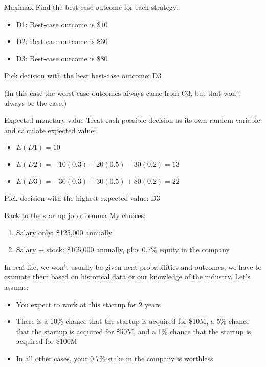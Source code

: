 \documentclass{beamer}\usepackage[]{graphicx}\usepackage[]{color}
\begin{document}
\begin{darkframes}
\begin{frame}{Maximax}
    Find the best-case outcome for each strategy:
    \begin{itemize}
      \item D1: Best-case outcome is $\$10$
      \item D2: Best-case outcome is $\$30$
      \item D3: Best-case outcome is $\$80$
    \end{itemize}
    Pick decision with the best best-case outcome: D3

    \pause
    
    (In this case the worst-case outcomes always came from O3, but that won't always be the case.)
  \end{frame}

  \begin{frame}[fragile]{Expected monetary value}
    Treat each possible decision as its own random variable and calculate expected value:

    \begin{itemize}[<+->]
      \item $E(D1) = 10$
      \item $E(D2) = -10(0.3) + 20(0.5) - 30(0.2) = 13$
      \item $E(D3) = -30(0.3) + 30(0.5) + 80(0.2) = 22$
    \end{itemize}

    Pick decision with the highest expected value: D3
  \end{frame}

  \begin{frame}{Back to the startup job dilemma}
    My choices:
    \begin{enumerate}
      \item \alert{Salary only}: \$125,000 annually
      \item \alert{Salary + stock}: \$105,000 annually, plus 0.7\% equity in the company
    \end{enumerate}

    \pause 
    In real life, we won't usually be given neat probabilities and outcomes; we have to estimate them based on historical data or our knowledge of the industry. Let's assume:
    \begin{itemize}[<+->]
      \item You expect to work at this startup for 2 years
      \item There is a 10\% chance that the startup is acquired for \$10M, a 5\% chance that the startup is acquired for \$50M, and a 1\% chance that the startup is acquired for \$100M
      \item In all other cases, your 0.7\% stake in the company is worthless
    \end{itemize}


\end{frame}
\end{darkframes}
\end{document}
